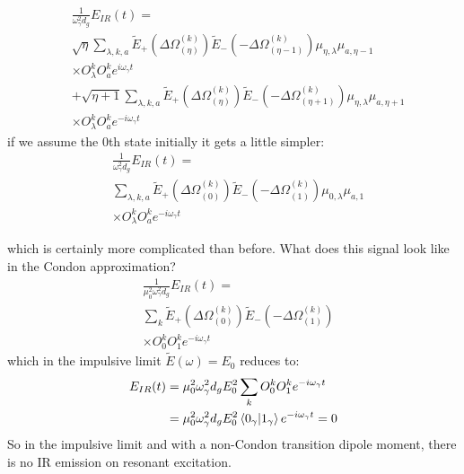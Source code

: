 \begin{align*}
	&\frac{1}{\omega_{\gamma}^2d_g}E_{IR}(t) = \\
	&\sqrt{\eta}\sum_{\lambda,k, a} \tilde{E}_{+} \left(\Delta \Omega_{(\eta)}^{(k)}\right)  \tilde{E}_{-}\left(-\Delta \Omega_{(\eta-1)}^{(k)}\right)  \mu_{\eta,\lambda}\mu_{a,\eta-1} \\
	&\times O_{\lambda}^{k} O_{a}^{k} e^{i \omega_{\gamma} t} \\
	&+ \sqrt{\eta+1}\sum_{\lambda,k, a} \tilde{E}_{+} \left(\Delta \Omega_{(\eta)}^{(k)}\right)  \tilde{E}_{-}\left(-\Delta \Omega_{(\eta+1)}^{(k)}\right)  \mu_{\eta,\lambda}\mu_{a,\eta+1} \\
	&\times O_{\lambda}^{k} O_{a}^{k} e^{-i\omega_{\gamma} t}
\end{align*}
if we assume the 0th state initially it gets a little simpler:
\begin{align*}
	&\frac{1}{\omega_{\gamma}^2d_g}E_{IR}(t) = \\
	&\sum_{\lambda,k, a} \tilde{E}_{+} \left(\Delta \Omega_{(0)}^{(k)}\right)  \tilde{E}_{-}\left(-\Delta \Omega_{(1)}^{(k)}\right)  \mu_{0,\lambda}\mu_{a,1} \\
	&\times O_{\lambda}^{k} O_{a}^{k} e^{-i\omega_{\gamma} t}
\end{align*}

which is certainly more complicated than before.  What does this signal look like in the Condon approximation?
\begin{align*}
	&\frac{1}{\mu_0^2 \omega_{\gamma}^2d_g}E_{IR}(t) = \\
	&\sum_{k} \tilde{E}_{+} \left(\Delta \Omega_{(0)}^{(k)}\right)  \tilde{E}_{-}\left(-\Delta \Omega_{(1)}^{(k)}\right)   \\
	&\times O_{0}^{k} O_{1}^{k} e^{-i\omega_{\gamma} t}
\end{align*}
which in the impulsive limit $\tilde{E}(\omega) = E_0$ reduces to:
\begin{align*}
	E_{IR}(t) &= \mu_0^2 \omega_{\gamma}^2d_gE_0^2 \sum_{k} O_{0}^{k} O_{1}^{k} e^{-i\omega_{\gamma} t} \\
	 &= \mu_0^2 \omega_{\gamma}^2d_gE_0^2 \braket{0_{\gamma} | 1_{\gamma}} e^{-i\omega_{\gamma} t} = 0
\end{align*}
So in the impulsive limit and with a non-Condon transition dipole moment, there is no IR emission on resonant excitation.

